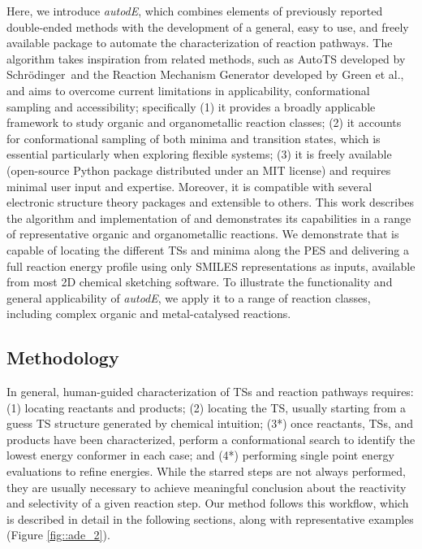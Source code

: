 \documentclass[../../main.tex]{subfiles}
\begin{document}
Here, we introduce \emph{autodE}, which combines elements of previously reported double-ended methods with the development of a general, easy to use, and freely available package to automate the characterization of reaction pathways. The \ade algorithm takes inspiration from related methods, such as AutoTS\cite{Jacobson2017} developed by Schr\"{o}dinger\texttrademark $\,$ and the Reaction Mechanism Generator developed by Green et al.,\cite{Gao2016} and aims to overcome current limitations in applicability, conformational sampling and accessibility; specifically (1) it provides a broadly applicable framework to study organic and organometallic reaction classes; (2) it accounts for conformational sampling of both minima and transition states, which is essential particularly when exploring flexible systems; (3) it is freely available (open-source Python package distributed under an MIT license) and requires minimal user input and expertise. Moreover, it is compatible with several electronic structure theory packages and extensible to others. This work describes the algorithm and implementation of \ade and demonstrates its capabilities in a range of representative organic and organometallic reactions. We demonstrate that \ade is capable of locating the different TSs and minima along the PES and delivering a full reaction energy profile using only SMILES representations as inputs, available from most 2D chemical sketching software. To illustrate the functionality and general applicability of \emph{autodE}, we apply it to a range of reaction classes, including complex organic and metal-catalysed reactions.


\subsection{Methodology}

In general, human-guided characterization of TSs and reaction pathways requires: (1) locating reactants and products; (2) locating the TS, usually starting from a guess TS structure generated by chemical intuition; (3*) once reactants, TSs, and products have been characterized, perform a conformational search to identify the lowest energy conformer in each case; and (4*) performing single point energy evaluations to refine energies. While the starred steps are not always performed, they are usually necessary to achieve meaningful conclusion about the reactivity and selectivity of a given reaction step. Our method follows this workflow, which is described in detail in the following sections, along with representative examples (Figure \ref{fig::ade_2}).
\end{document}
